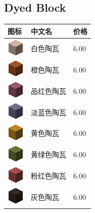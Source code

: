 \documentclass[UTF8]{ctexart}
\begin{document}
\subsection{Dyed Block}
\begin{longtable}[]{|p{1cm}|p{8cm}|p{1.5cm}|}
\toprule
图标 & 中文名 & 价格\\
\midrule
	\includegraphics{.workspace/icons/minecraft/minecraft__stained_hardened_clay__0.png} & 白色陶瓦 &6.00\\
	\hline
	\includegraphics{.workspace/icons/minecraft/minecraft__stained_hardened_clay__1.png} & 橙色陶瓦 &6.00\\
	\hline
	\includegraphics{.workspace/icons/minecraft/minecraft__stained_hardened_clay__2.png} & 品红色陶瓦 &6.00\\
	\hline
	\includegraphics{.workspace/icons/minecraft/minecraft__stained_hardened_clay__3.png} & 淡蓝色陶瓦 &6.00\\
	\hline
	\includegraphics{.workspace/icons/minecraft/minecraft__stained_hardened_clay__4.png} & 黄色陶瓦 &6.00\\
	\hline
	\includegraphics{.workspace/icons/minecraft/minecraft__stained_hardened_clay__5.png} & 黄绿色陶瓦 &6.00\\
	\hline
	\includegraphics{.workspace/icons/minecraft/minecraft__stained_hardened_clay__6.png} & 粉红色陶瓦 &6.00\\
	\hline
	\includegraphics{.workspace/icons/minecraft/minecraft__stained_hardened_clay__7.png} & 灰色陶瓦 &6.00\\

\end{longtable}
\end{document}
